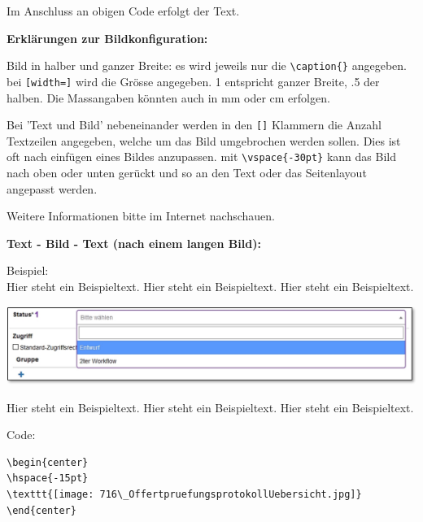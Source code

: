 Im Anschluss an obigen Code erfolgt der Text.

\vspace{\baselineskip}

\textbf{Erklärungen zur Bildkonfiguration:}

\begin{compactitem}
	\item Bild in halber und ganzer Breite: es wird jeweils nur die \verb+\caption{}+ angegeben. bei \verb+[width=]+ wird die Grösse angegeben. 1 entspricht ganzer Breite, .5 der halben. Die Massangaben könnten auch in mm oder cm erfolgen.
	\item Bei 'Text und Bild' nebeneinander werden in den \verb+[]+ Klammern die Anzahl Textzeilen angegeben, welche um das Bild umgebrochen werden sollen. Dies ist oft nach einfügen eines Bildes anzupassen. mit \verb+\vspace{-30pt}+ kann das Bild nach oben oder unten gerückt und so an den Text oder das Seitenlayout angepasst werden.
	\item Weitere Informationen bitte im Internet nachschauen.
\end{compactitem}

\vspace{\baselineskip}

\textbf{Text - Bild - Text (nach einem langen Bild):}

Beispiel:\\
Hier steht ein Beispieltext. Hier steht ein Beispieltext. Hier steht ein Beispieltext.

\begin{center}
\hspace{-15pt}   
\includegraphics[width=.4\linewidth]{../pictures/Printscreen.jpg}
\end{center}

Hier steht ein Beispieltext. Hier steht ein Beispieltext. Hier steht ein Beispieltext.

\vspace{\baselineskip}

Code:

\begin{verbatim}
\begin{center}
\hspace{-15pt}   
\texttt{[image: 716\_OffertpruefungsprotokollUebersicht.jpg]}
\end{center}
\end{verbatim}

